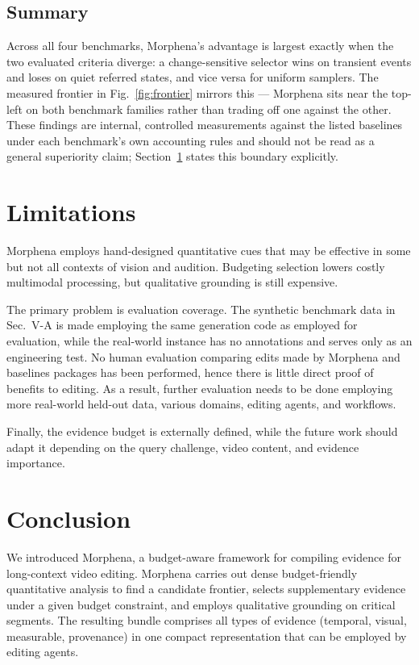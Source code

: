 \documentclass[conference]{IEEEtran}
\begin{document}
\subsection{Summary}
Across all four benchmarks, Morphena's advantage is largest exactly when the two evaluated criteria diverge: a change-sensitive selector wins on transient events and loses on quiet referred states, and vice versa for uniform samplers. The measured frontier in Fig.~\ref{fig:frontier} mirrors this — Morphena sits near the top-left on both benchmark families rather than trading off one against the other. These findings are internal, controlled measurements against the listed baselines under each benchmark's own accounting rules and should not be read as a general superiority claim; Section~\ref{sec:limitations} states this boundary explicitly.

\section{Limitations}
\label{sec:limitations}

Morphena employs hand-designed quantitative cues that may be effective in some but not all contexts of vision and audition. Budgeting selection lowers costly multimodal processing, but qualitative grounding is still expensive.

The primary problem is evaluation coverage. The synthetic benchmark data in Sec.~V-A is made employing the same generation code as employed for evaluation, while the real-world instance has no annotations and serves only as an engineering test. No human evaluation comparing edits made by Morphena and baselines packages has been performed, hence there is little direct proof of benefits to editing. As a result, further evaluation needs to be done employing more real-world held-out data, various domains, editing agents, and workflows.

Finally, the evidence budget is externally defined, while the future work should adapt it depending on the query challenge, video content, and evidence importance.

\section{Conclusion}
We introduced Morphena, a budget-aware framework for compiling evidence for long-context video editing. Morphena carries out dense budget-friendly quantitative analysis to find a candidate frontier, selects supplementary evidence under a given budget constraint, and employs qualitative grounding on critical segments. The resulting bundle comprises all types of evidence (temporal, visual, measurable, provenance) in one compact representation that can be employed by editing agents.
\end{document}
